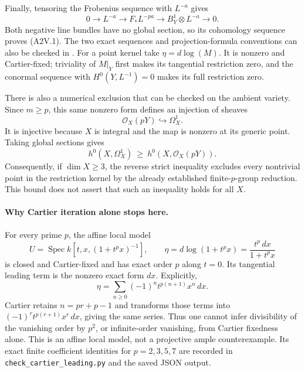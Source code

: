 Finally, tensoring the Frobenius sequence with $L^{-a}$ gives
\[
 0\longrightarrow L^{-a}\longrightarrow F_*L^{-pa}
  \longrightarrow B_Y^1\otimes L^{-a}\longrightarrow0.
\]
Both negative line bundles have no global section, so its
cohomology sequence proves (A2V.1). The two exact sequences
and projection-formula conventions can also be checked in
\cite[Lemmas 9.2 and 9.5, pp.~2106--2107]{DGJ_Langer2011}.
For a point kernel take $\eta=d\log(M)$. It is nonzero and
Cartier-fixed; triviality of $M|_Y$ first makes its tangential
restriction zero, and the conormal sequence with
$H^0(Y,L^{-1})=0$ makes its full restriction zero.

There is also a numerical exclusion that can be checked on the
ambient variety. Since $m\geq p$, this same nonzero form defines
an injection of sheaves
\[
 \mathcal O_X(pY)\hookrightarrow\Omega_X^1.
\]
It is injective because $X$ is integral and the map is nonzero
at its generic point. Taking global sections gives
\[
 h^0(X,\Omega_X^1)\ \geq\ h^0(X,\mathcal O_X(pY)).
                                                        \tag{A2V.2}
\]
Consequently, if $\dim X\geq3$, the reverse strict inequality
excludes every nontrivial point in the restriction kernel by
the already established finite-$p$-group reduction. This bound
does not assert that such an inequality holds for all $X$.

\paragraph{Why Cartier iteration alone stops here.}
For every prime $p$, the affine local model
\[
 U=\operatorname{Spec}k[t,x,(1+t^px)^{-1}],\qquad
 \eta=d\log(1+t^px)=\frac{t^p\,dx}{1+t^px}
\]
is closed and Cartier-fixed and has exact order $p$ along
$t=0$. Its tangential leading term is the nonzero exact form
$dx$. Explicitly,
\[
 \eta=\sum_{n\geq0}(-1)^n t^{p(n+1)}x^n\,dx.
\]
Cartier retains $n=pr+p-1$ and transforms those terms into
$(-1)^r t^{p(r+1)}x^r\,dx$, giving the same series.
Thus one cannot infer divisibility of the vanishing order by
$p^2$, or infinite-order vanishing, from Cartier fixedness
alone. This is an affine local model, not a projective ample
counterexample. Its exact finite coefficient identities for
$p=2,3,5,7$ are recorded in
\texttt{check\_cartier\_leading.py} and the saved JSON output.

